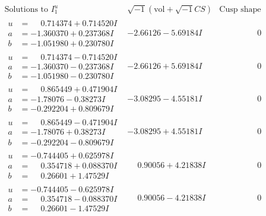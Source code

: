 \documentclass[1p]{elsarticle_modified}
\theoremstyle{definition}
\newcommand{\I}{\sqrt{-1}}
\begin{document}
$$\begin{array}{c|c|c}  
\text{Solutions to }I^u_{1}& \I (\text{vol} + \sqrt{-1}CS) & \text{Cusp shape}\\
 \hline 
\begin{aligned}
u &= \phantom{-}0.714374 + 0.714520 I \\
a &= -1.360370 + 0.237368 I \\
b &= -1.051980 + 0.230780 I\end{aligned}
 & -2.66126 - 5.69184 I & \phantom{-0.000000 } 0 \\ \hline\begin{aligned}
u &= \phantom{-}0.714374 - 0.714520 I \\
a &= -1.360370 - 0.237368 I \\
b &= -1.051980 - 0.230780 I\end{aligned}
 & -2.66126 + 5.69184 I & \phantom{-0.000000 } 0 \\ \hline\begin{aligned}
u &= \phantom{-}0.865449 + 0.471904 I \\
a &= -1.78076 - 0.38273 I \\
b &= -0.292204 + 0.809679 I\end{aligned}
 & -3.08295 - 4.55181 I & \phantom{-0.000000 } 0 \\ \hline\begin{aligned}
u &= \phantom{-}0.865449 - 0.471904 I \\
a &= -1.78076 + 0.38273 I \\
b &= -0.292204 - 0.809679 I\end{aligned}
 & -3.08295 + 4.55181 I & \phantom{-0.000000 } 0 \\ \hline\begin{aligned}
u &= -0.744405 + 0.625978 I \\
a &= \phantom{-}0.354718 + 0.088370 I \\
b &= \phantom{-}0.26601 + 1.47529 I\end{aligned}
 & \phantom{-}0.90056 + 4.21838 I & \phantom{-0.000000 } 0 \\ \hline\begin{aligned}
u &= -0.744405 - 0.625978 I \\
a &= \phantom{-}0.354718 - 0.088370 I \\
b &= \phantom{-}0.26601 - 1.47529 I\end{aligned}
 & \phantom{-}0.90056 - 4.21838 I & \phantom{-0.000000 } 0 \\ \hline\begin{aligned}

\end{aligned}
\end{array}$$
\end{document}
